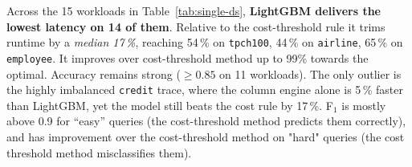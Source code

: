 \documentclass[sigconf, nonacm]{acmart}
\begin{document}
Across the 15 workloads in Table~\ref{tab:single-ds},
\textbf{LightGBM delivers the lowest latency on 14 of them}.
Relative to the cost-threshold rule it trims runtime by a
\emph{median 17\,\%}, reaching
54\,\% on \texttt{tpch100},
44\,\% on \texttt{airline},
65\,\% on \texttt{employee}.
It improves over cost-threshold method up to 99\% towards the optimal.
Accuracy remains strong ($\ge0.85$ on 11 workloads).
The only outlier is the highly imbalanced \texttt{credit} trace, where
the column engine alone is 5\,\% faster than LightGBM, yet the model
still beats the cost rule by 17\,\%.
F$_1$ is mostly above 0.9 for “easy” queries (the cost-threshold method predicts them correctly), and has improvement over the cost-threshold method on "hard" queries (the cost threshold method misclassifies them).
\end{document}
